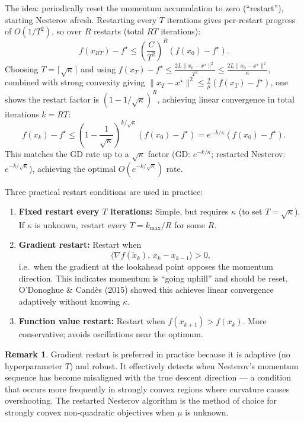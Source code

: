 \documentclass[11pt,a4paper]{article}
\theoremstyle{definition}
\newtheorem{remark}[theorem]{Remark}
\begin{document}
The idea: periodically reset the momentum accumulation to zero (``restart''), starting Nesterov afresh. Restarting every $T$ iterations gives per-restart progress of $O(1/T^2)$, so over $R$ restarts (total $RT$ iterations):
\[
f(x_{RT}) - f^{\star} \leq \left(\frac{C}{T^2}\right)^R (f(x_0) - f^{\star}).
\]
Choosing $T = \lceil\sqrt{\kappa}\rceil$ and using $f(x_T) - f^{\star} \leq \frac{2L\|x_0-x^{\star}\|^2}{T^2} \leq \frac{2L\|x_0-x^{\star}\|^2}{\kappa}$, combined with strong convexity giving $\|x_T - x^{\star}\|^2 \leq \frac{2}{\mu}(f(x_T) - f^{\star})$, one shows the restart factor is $(1 - 1/\sqrt{\kappa})^R$, achieving linear convergence in total iterations $k = RT$:
\begin{equation}
f(x_k) - f^{\star} \leq \left(1 - \frac{1}{\sqrt{\kappa}}\right)^{k/\sqrt{\kappa}} (f(x_0) - f^{\star}) = e^{-k/\kappa} (f(x_0) - f^{\star}).
\label{eq:restart_rate}
\end{equation}
This matches the GD rate up to a $\sqrt{\kappa}$ factor (GD: $e^{-k/\kappa}$; restarted Nesterov: $e^{-k/\sqrt{\kappa}}$), achieving the optimal $O(e^{-k/\sqrt{\kappa}})$ rate.

Three practical restart conditions are used in practice:
\begin{enumerate}
\item \textbf{Fixed restart every $T$ iterations:} Simple, but requires $\kappa$ (to set $T = \sqrt{\kappa}$). If $\kappa$ is unknown, restart every $T = k_{\max}/R$ for some $R$.
\item \textbf{Gradient restart:} Restart when
\[
\langle \nabla f(\tilde{x}_k),\, x_k - x_{k-1} \rangle > 0,
\]
i.e.\ when the gradient at the lookahead point opposes the momentum direction. This indicates momentum is ``going uphill'' and should be reset. O'Donoghue \& Cand\`es (2015) showed this achieves linear convergence adaptively without knowing $\kappa$.
\item \textbf{Function value restart:} Restart when $f(x_{k+1}) > f(x_k)$. More conservative; avoids oscillations near the optimum.
\end{enumerate}

\begin{remark}
Gradient restart is preferred in practice because it is adaptive (no hyperparameter $T$) and robust. It effectively detects when Nesterov's momentum sequence has become misaligned with the true descent direction --- a condition that occurs more frequently in strongly convex regions where curvature causes overshooting. The restarted Nesterov algorithm is the method of choice for strongly convex non-quadratic objectives when $\mu$ is unknown.
\end{remark}
\end{document}
